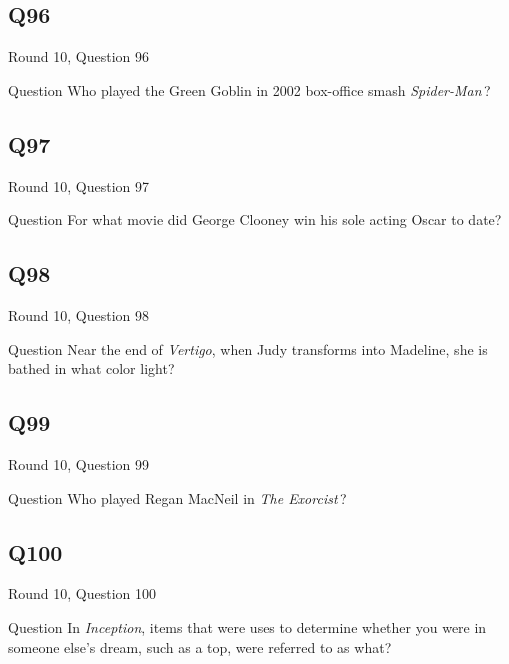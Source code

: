 \documentclass[11pt]{beamer}
\begin{document}
\subsection*{Q96}
\begin{frame}[t]{Round 10, Question 96}
\vspace{2em}
\begin{block}{Question}
Who played the Green Goblin in 2002 box-office smash \emph{Spider-Man}\,?
\end{block}
\end{frame}
    

\subsection*{Q97}
\begin{frame}[t]{Round 10, Question 97}
\vspace{2em}
\begin{block}{Question}
For what movie did George Clooney win his sole acting Oscar to date?
\end{block}
\end{frame}
    

\subsection*{Q98}
\begin{frame}[t]{Round 10, Question 98}
\vspace{2em}
\begin{block}{Question}
Near the end of \emph{Vertigo}, when Judy transforms into Madeline, she is bathed in what color light?
\end{block}
\end{frame}
    

\subsection*{Q99}
\begin{frame}[t]{Round 10, Question 99}
\vspace{2em}
\begin{block}{Question}
Who played Regan MacNeil in \emph{The Exorcist}\,?
\end{block}
\end{frame}
    

\subsection*{Q100}
\begin{frame}[t]{Round 10, Question 100}
\vspace{2em}
\begin{block}{Question}
In \emph{Inception}, items that were uses to determine whether you were in someone else's dream, such as a top, were referred to as what?
\end{block}
\end{frame}
    
\end{document}
